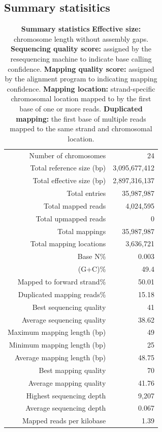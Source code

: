 \documentclass{article}
\begin{document}
\subsection{Summary statisitics}
\begin{table}
\begin{tabular}{|r|r|}
  \hline
  \rowcolor[gray]{0.9} \hline
Number of chromosomes & 24 \\ 
  Total reference size (bp) & 3,095,677,412 \\ 
   \rowcolor[gray]{0.9}Total effective size (bp) & 2,897,316,137 \\ 
  Total entries & 35,987,987 \\ 
   \rowcolor[gray]{0.9}Total mapped reads & 4,024,595 \\ 
  Total upmapped reads & 0 \\ 
   \rowcolor[gray]{0.9}Total mappings & 35,987,987 \\ 
  Total mapping locations & 3,636,721 \\ 
   \rowcolor[gray]{0.9}Base N\% & 0.003 \\ 
  (G+C)\% & 49.4 \\ 
   \rowcolor[gray]{0.9}Mapped to forward strand\% & 50.01 \\ 
  Duplicated mapping reads\% & 15.18 \\ 
   \rowcolor[gray]{0.9}Best sequencing quality & 41 \\ 
  Average sequencing quality & 38.62 \\ 
   \rowcolor[gray]{0.9}Maximum mapping length (bp) & 49 \\ 
  Minimum mapping length (bp) & 25 \\ 
   \rowcolor[gray]{0.9}Average mapping length (bp) & 48.75 \\ 
  Best mapping quality & 70 \\ 
   \rowcolor[gray]{0.9}Average mapping quality & 41.76 \\ 
  Highest sequencing depth & 9,207 \\ 
   \rowcolor[gray]{0.9}Average sequencing depth & 0.067 \\ 
  Mapped reads per kilobase & 1.39 \\ 
   \hline
\end{tabular}\caption{\textbf{Summary statistics}
\newline
\textbf{Effective size:} chromosome length without assembly gaps.
\newline
\textbf{Sequencing quality score:} assigned by the resequencing machine to indicate base calling confidence. 
\newline
\textbf{Mapping quality score:}  assigned by the alignment program to indicating mapping confidence.
\newline
\textbf{Mapping location:} strand-specific chromosomal location mapped to by the first base of one or more reads.
\newline
\textbf{Duplicated mapping:} the first base of multiple reads mapped to the same strand and chromosomal location.
}
\end{table}
\end{document}

